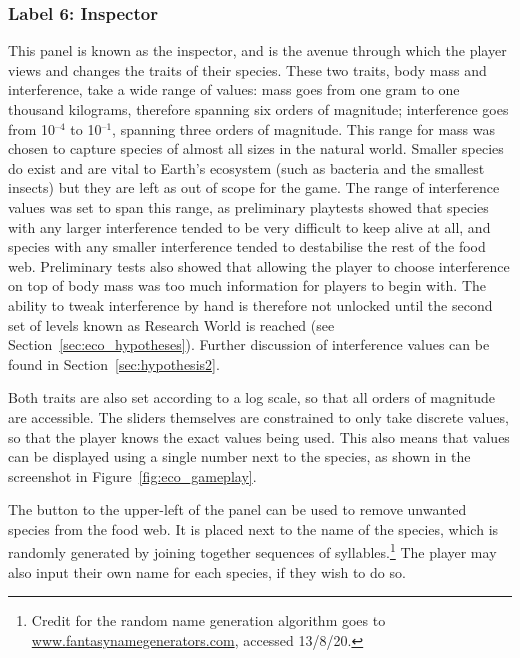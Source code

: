 \subsubsection{Label 6: Inspector}
This panel is known as the inspector, and is the avenue through which the player views and changes the traits of their species.
These two traits, body mass and interference, take a wide range of values: mass goes from one gram to one thousand kilograms, therefore spanning six orders of magnitude; interference goes from 10$^{\text{--}4}$ to 10$^{\text{--}1}$, spanning three orders of magnitude. This range for mass was chosen to capture species of almost all sizes in the natural world. Smaller species do exist and are vital to Earth's ecosystem (such as bacteria and the smallest insects) but they are left as out of scope for the game.
The range of interference values was set to span this range, as preliminary playtests showed that species with any larger interference tended to be very difficult to keep alive at all, and species with any smaller interference tended to destabilise the rest of the food web.
Preliminary tests also showed that allowing the player to choose interference on top of body mass was too much information for players to begin with. The ability to tweak interference by hand is therefore not unlocked until the second set of levels known as Research World is reached (see Section~\ref{sec:eco_hypotheses}).
Further discussion of interference values can be found in Section~\ref{sec:hypothesis2}.

Both traits are also set according to a log scale, so that all orders of magnitude are accessible. The sliders themselves are constrained to only take discrete values, so that the player knows the exact values being used. This also means that values can be displayed using a single number next to the species, as shown in the screenshot in Figure~\ref{fig:eco_gameplay}.

The button to the upper-left of the panel can be used to remove unwanted species from the food web. It is placed next to the name of the species, which is randomly generated by joining together sequences of syllables.\footnote{Credit for the random name generation algorithm goes to \url{www.fantasynamegenerators.com}, accessed 13/8/20.}
The player may also input their own name for each species, if they wish to do so.

